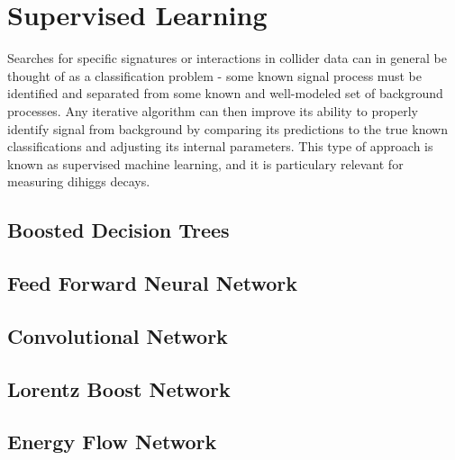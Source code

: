 \section{Supervised Learning}
\label{sec:supervised}
Searches for specific signatures or interactions in collider data can in general be thought of as a classification problem - some known signal process must be identified and separated from some known and well-modeled set of background processes. Any iterative algorithm can then improve its ability to properly identify signal from background by comparing its predictions to the true known classifications and adjusting its internal parameters. This type of approach is known as supervised machine learning, and it is particulary relevant for measuring dihiggs decays. 

\subsection{Boosted Decision Trees}


\subsection{Feed Forward Neural Network}


\subsection{Convolutional Network}



\subsection{Lorentz Boost Network}


\subsection{Energy Flow Network}

